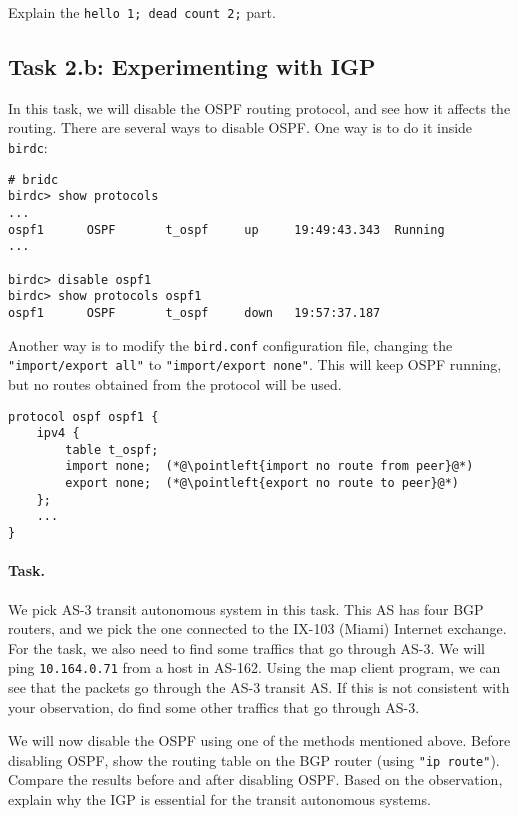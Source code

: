 Explain the \texttt{hello 1; dead count 2;} part. 



\subsection{Task 2.b: Experimenting with IGP} 

In this task, we will disable the OSPF routing protocol, and see 
how it affects the routing. There are several ways to disable
OSPF. One way is to do it inside \texttt{birdc}: 

\begin{lstlisting}
# bridc
birdc> show protocols
...
ospf1      OSPF       t_ospf     up     19:49:43.343  Running
...

birdc> disable ospf1
birdc> show protocols ospf1
ospf1      OSPF       t_ospf     down   19:57:37.187
\end{lstlisting}
 
Another way is to modify the \texttt{bird.conf} configuration file,
changing the \texttt{"import/export all"} to 
\texttt{"import/export none"}. This will keep OSPF running, but  
no routes obtained from the protocol will be used. 

\begin{lstlisting}
protocol ospf ospf1 {
    ipv4 {
        table t_ospf;
        import none;  (*@\pointleft{import no route from peer}@*) 
        export none;  (*@\pointleft{export no route to peer}@*) 
    };
    ...
}
\end{lstlisting}
 

\paragraph{Task.} We pick AS-3 transit autonomous system in this 
task. This AS has four BGP routers, and we pick the one 
connected to the IX-103 (Miami) Internet exchange.
For the task, we also need to find some traffics that 
go through AS-3. 
We will ping \texttt{10.164.0.71} from a host in AS-162. Using the 
map client program, we can see that the packets go through
the AS-3 transit AS. If this is not consistent with your observation,
do find some other traffics that go through AS-3. 


We will now disable the OSPF using one of the methods mentioned above.
Before disabling OSPF, show the routing table 
on the BGP router (using \texttt{"ip route"}). Compare the 
results before and after disabling OSPF. Based on the 
observation, explain why the IGP is essential for the transit 
autonomous systems. 


